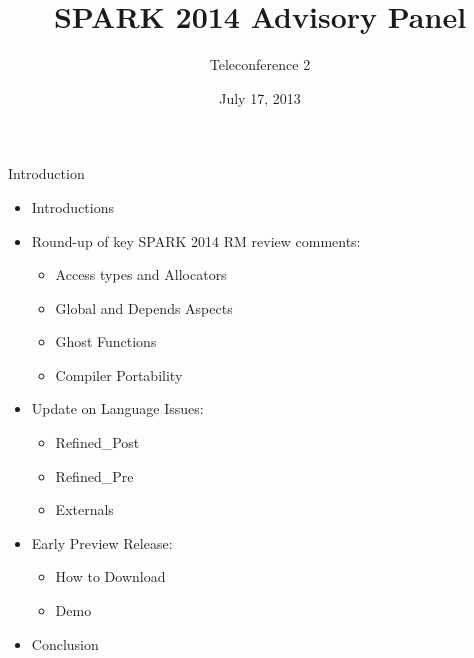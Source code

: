 \documentclass{beamer}
\title{SPARK 2014 Advisory Panel}
\subtitle{Teleconference 2}
\date{July 17, 2013}
\begin{document}
\begin{altrantitle}
\end{altrantitle}

\begin{frame}{Introduction}

  \begin{itemize}

  \item Introductions
  \item Round-up of key SPARK 2014 RM review comments:
    \begin{itemize}
    \item Access types and Allocators
    \item Global and Depends Aspects
    \item Ghost Functions
    \item Compiler Portability
    \end{itemize}
  \item Update on Language Issues: 
    \begin{itemize}
    \item Refined\_Post
    \item Refined\_Pre
    \item Externals
    \end{itemize}
  \item Early Preview Release:
    \begin{itemize}
    \item How to Download
    \item Demo
    \end{itemize}
  \item Conclusion

  \end{itemize}

\end{frame}
\end{document}

